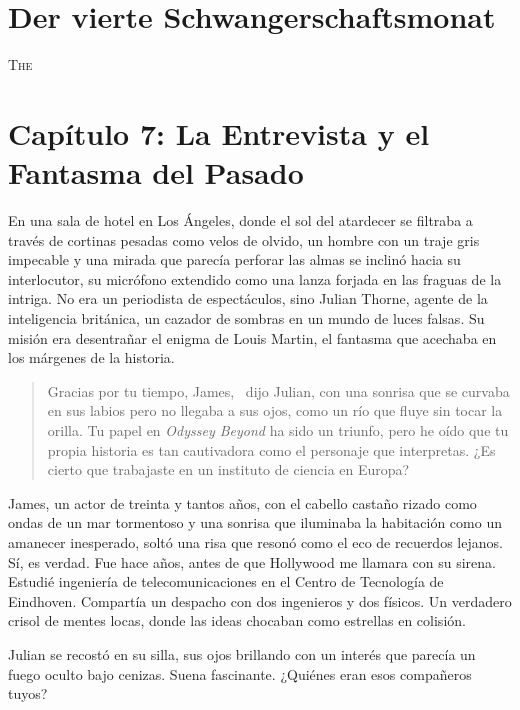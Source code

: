 \chapter*{Der vierte Schwangerschaftsmonat}

\lettrine[lines=2, loversize=0.3, lraise=0]{\initfamily T}{he}

\chapter{Capítulo 7: La Entrevista y el Fantasma del Pasado}

En una sala de hotel en Los Ángeles, donde el sol del atardecer se filtraba a través de cortinas pesadas como velos de olvido, un hombre con un traje gris impecable y una mirada que parecía perforar las almas se inclinó hacia su interlocutor, su micrófono extendido como una lanza forjada en las fraguas de la intriga. No era un periodista de espectáculos, sino Julian Thorne, agente de la inteligencia británica, un cazador de sombras en un mundo de luces falsas. Su misión era desentrañar el enigma de Louis Martin, el fantasma que acechaba en los márgenes de la historia.

\begin{quote}
\calli
\glqq Gracias por tu tiempo, James,\grqq~ dijo Julian, con una sonrisa que se curvaba en sus labios pero no llegaba a sus ojos, como un río que fluye sin tocar la orilla. \glqq Tu papel en \emph{Odyssey Beyond} ha sido un triunfo, pero he oído que tu propia historia es tan cautivadora como el personaje que interpretas. ¿Es cierto que trabajaste en un instituto de ciencia en Europa?\grqq
\end{quote}

James, un actor de treinta y tantos años, con el cabello castaño rizado como ondas de un mar tormentoso y una sonrisa que iluminaba la habitación como un amanecer inesperado, soltó una risa que resonó como el eco de recuerdos lejanos. \glqq Sí, es verdad. Fue hace años, antes de que Hollywood me llamara con su sirena. Estudié ingeniería de telecomunicaciones en el Centro de Tecnología de Eindhoven. Compartía un despacho con dos ingenieros y dos físicos. Un verdadero crisol de mentes locas, donde las ideas chocaban como estrellas en colisión.\grqq

Julian se recostó en su silla, sus ojos brillando con un interés que parecía un fuego oculto bajo cenizas. \glqq Suena fascinante. ¿Quiénes eran esos compañeros tuyos?\grqq


